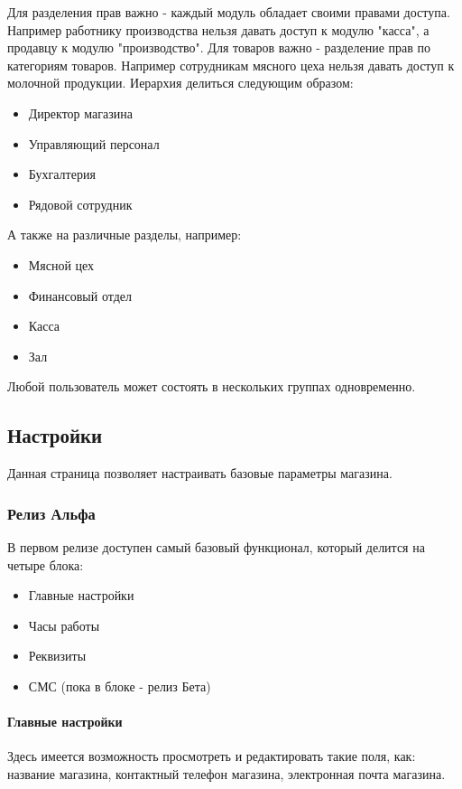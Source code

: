\documentclass[DIV=calc, paper=a4, fontsize=11pt]{scrartcl} %
\begin{document}
Для разделения прав важно - каждый модуль обладает своими правами доступа. Например работнику производства нельзя давать доступ к модулю "касса", а продавцу к модулю "производство".
Для товаров важно - разделение прав по категориям товаров. Например сотрудникам мясного цеха нельзя давать доступ к молочной продукции.
Иерархия делиться следующим образом:

\begin{itemize}
	\item Директор магазина
	\item Управляющий персонал
	\item Бухгалтерия
	\item Рядовой сотрудник
\end{itemize}

А также на различные разделы, например:

\begin{itemize}
	\item Мясной цех
	\item Финансовый отдел
	\item Касса
	\item Зал
\end{itemize}

Любой пользователь может состоять в нескольких группах одновременно.

\subsection{Настройки}

Данная страница позволяет настраивать базовые параметры магазина.

\subsubsection{Релиз Альфа}

В первом релизе доступен самый базовый функционал, который делится на четыре блока:

\begin{itemize}
	\item Главные настройки
	\item Часы работы
	\item Реквизиты
	\item СМС (пока в блоке - релиз Бета)
\end{itemize}

\paragraph{Главные настройки}
Здесь имеется возможность просмотреть и редактировать такие поля, как: название магазина, контактный телефон магазина, электронная почта магазина.
\end{document}
